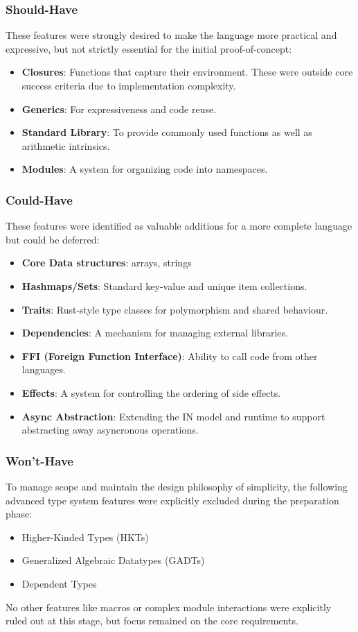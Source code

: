 \subsubsection*{Should-Have}
These features were strongly desired to make the language more practical and expressive, but not strictly essential for the initial proof-of-concept:
\begin{itemize}
    \item \textbf{Closures}: Functions that capture their environment. These were outside core success criteria due to implementation complexity.
    \item \textbf{Generics}: For expressiveness and code reuse.
    \item \textbf{Standard Library}: To provide commonly used functions as well as arithmetic intrinsics.
    \item \textbf{Modules}: A system for organizing code into namespaces.
\end{itemize}

\subsubsection*{Could-Have}
These features were identified as valuable additions for a more complete language but could be deferred:
\begin{itemize}
    \item \textbf{Core Data structures}: arrays, strings
    \item \textbf{Hashmaps/Sets}: Standard key-value and unique item collections.
    \item \textbf{Traits}: Rust-style type classes for polymorphism and shared behaviour.
    \item \textbf{Dependencies}: A mechanism for managing external libraries.
    \item \textbf{FFI (Foreign Function Interface)}: Ability to call code from other languages.
    \item \textbf{Effects}: A system for controlling the ordering of side effects.
    \item \textbf{Async Abstraction}: Extending the IN model and runtime to support abstracting away asyncronous operations.
\end{itemize}

\subsubsection*{Won't-Have}
To manage scope and maintain the design philosophy of simplicity, the following advanced type system features were explicitly excluded during the preparation phase:
\begin{itemize}
    \item Higher-Kinded Types (HKTs)
    \item Generalized Algebraic Datatypes (GADTs)
    \item Dependent Types
\end{itemize}
No other features like macros or complex module interactions were explicitly ruled out at this stage, but focus remained on the core requirements.

